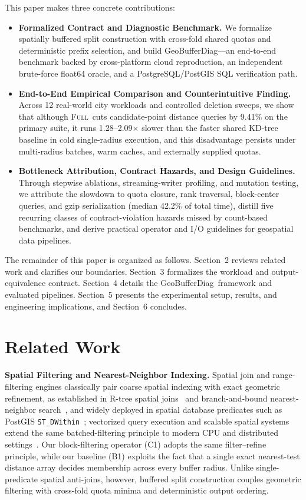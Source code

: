 \documentclass[sigconf, nonacm]{acmart}
\newcommand{\sys}{GeoBufferDiag}
\newcommand{\full}{\textsc{Full}}
\begin{document}
This paper makes three concrete contributions:
\begin{itemize}
\item \textbf{Formalized Contract and Diagnostic Benchmark.} We formalize spatially buffered split construction with cross-fold shared quotas and deterministic prefix selection, and build \sys---an end-to-end benchmark backed by cross-platform cloud reproduction, an independent brute-force float64 oracle, and a PostgreSQL/PostGIS SQL verification path.
\item \textbf{End-to-End Empirical Comparison and Counterintuitive Finding.} Across 12 real-world city workloads and controlled deletion sweeps, we show that although \full\ cuts candidate-point distance queries by 9.41\% on the primary suite, it runs 1.28--2.09$\times$ slower than the faster shared KD-tree baseline in cold single-radius execution, and this disadvantage persists under multi-radius batches, warm caches, and externally supplied quotas.
\item \textbf{Bottleneck Attribution, Contract Hazards, and Design Guidelines.} Through stepwise ablations, streaming-writer profiling, and mutation testing, we attribute the slowdown to quota closure, rank traversal, block-center queries, and gzip serialization (median 42.2\% of total time), distill five recurring classes of contract-violation hazards missed by count-based benchmarks, and derive practical operator and I/O guidelines for geospatial data pipelines.
\end{itemize}

The remainder of this paper is organized as follows. Section~2 reviews related work and clarifies our boundaries. Section~3 formalizes the workload and output-equivalence contract. Section~4 details the \sys\ framework and evaluated pipelines. Section~5 presents the experimental setup, results, and engineering implications, and Section~6 concludes.

\section{Related Work}
\textbf{Spatial Filtering and Nearest-Neighbor Indexing.} Spatial join and range-filtering engines classically pair coarse spatial indexing with exact geometric refinement, as established in R-tree spatial joins~\cite{brinkhoff1993} and branch-and-bound nearest-neighbor search~\cite{roussopoulos1995}, and widely deployed in spatial database predicates such as PostGIS \texttt{ST\_DWithin}~\cite{postgis}; vectorized query execution and scalable spatial systems extend the same batched-filtering principle to modern CPU and distributed settings~\cite{boncz2005,eldawy2015}. Our block-filtering operator (C1) adopts the same filter--refine principle, while our baseline (B1) exploits the fact that a single exact nearest-test distance array decides membership across every buffer radius. Unlike single-predicate spatial anti-joins, however, buffered split construction couples geometric filtering with cross-fold quota minima and deterministic output ordering.
\end{document}
